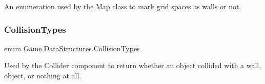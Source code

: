 An enumeration used by the Map class to mark grid spaces as walls or not. 

\mbox{\label{namespace_game_1_1_data_structures_ada1f9e4784b55145987867a5daf71d4d}} 
\subsubsection{\texorpdfstring{Collision\+Types}{CollisionTypes}}
{\footnotesize\ttfamily enum \mbox{\hyperlink{namespace_game_1_1_data_structures_ada1f9e4784b55145987867a5daf71d4d}{Game.\+Data\+Structures.\+Collision\+Types}}\hspace{0.3cm}{\ttfamily [strong]}}



Used by the Collider component to return whether an object collided with a wall, object, or nothing at all. 

